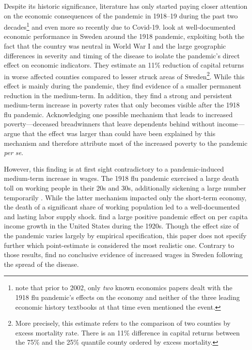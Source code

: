 \documentclass[12pt,a4paper]{article}
\begin{document}
Despite its historic significance, literature has only started paying closer attention on the economic consequences of the pandemic in 1918--19 during the past two decades\footnote{\cite{brainerdEconomicEffects19182003} note that prior to 2002, only \textit{two} known economics papers dealt with the 1918 flu pandemic's effects on the economy and neither of the three leading economic history textbooks at that time even mentioned the event.} and even more so recently due to Covid-19.
\cite{karlssonImpact1918Spanish2014} look at well-documented economic performance in Sweden around the 1918 pandemic, exploiting both the fact that the country was neutral in World War I and the large geographic differences in severity and timing of the disease to isolate the pandemic's direct effect on economic indicators.
They estimate an 11\% reduction of capital returns in worse affected counties compared to lesser struck areas of Sweden\footnote{More precisely, this estimate refers to the comparison of two counties by excess mortality rate. There is an 11\% difference in capital returns between the 75\% and the 25\% quantile county ordered by excess mortality.}.
While this effect is mainly during the pandemic, they find evidence of a smaller permanent reduction in the medium-term.
In addition, they find a strong and persistent medium-term increase in poverty rates that only becomes visible after the 1918 flu pandemic.
Acknowledging one possible mechanism that leads to increased poverty---deceased breadwinners that leave dependents behind without income---\cite{karlssonImpact1918Spanish2014} argue that the effect was larger than could have been explained by this mechanism and therefore attribute most of the increased poverty to the pandemic \textit{per se}.

However, this finding is at first sight contradictory to a pandemic-induced medium-term increase in wages.
The 1918 flu pandemic exercised a large death toll on working people in their 20s and 30s, additionally sickening a large number temporarily \citep{taubenberger1918InfluenzaMother2006}. 
While the latter mechanism impacted only the short-term economy,
the death of a significant share of working population led to a well-documented and lasting labor supply shock.
\cite{brainerdEconomicEffects19182003} find a large positive pandemic effect on per capita income growth in the United States during the 1920s.
Though the effect size of the pandemic varies largely by empirical specification, this paper does not specify further which point-estimate is considered the most realistic one.
Contrary to those results, \cite{karlssonImpact1918Spanish2014} find no conclusive evidence of increased wages in Sweden following the spread of the disease.
\end{document}
